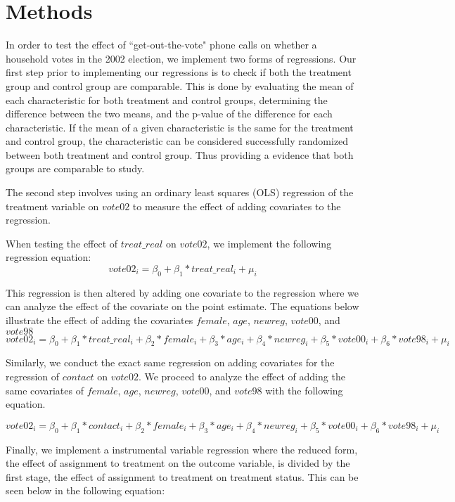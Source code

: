 \documentclass[12pt]{article}
\begin{document}
\section{Methods}
\indent In order to test the effect of ``get-out-the-vote" phone calls on whether a household votes in the 2002 election, we implement two forms of regressions. Our first step prior to implementing our regressions is to check if both the treatment group and control group are comparable. This is done by evaluating the mean of each characteristic for both treatment and control groups, determining the difference between the two means, and the p-value of the difference for each characteristic. If the mean of a given characteristic is the same for the treatment and control group, the characteristic can be considered successfully randomized between both treatment and control group. Thus providing a evidence that both groups are comparable to study.

\indent The second step involves using an ordinary least squares (OLS) regression of the treatment variable on $vote02$ to measure the effect of adding covariates to the regression.

\indent When testing the effect of $treat\_real$ on $vote02$, we implement the following regression equation:
$$vote02_i = \beta_0 +\beta_1*treat\_real_i+\mu_i$$

This regression is then altered by adding one covariate to the regression where we can analyze the effect of the covariate on the point estimate. The equations below illustrate the effect of adding the covariates $female$, $age$, $newreg$, $vote00$, and $vote98$
$$vote02_i = \beta_0 +\beta_1*treat\_real_i+\beta_2*female_i+\beta_3*age_i+\beta_4*newreg_i+\beta_5*vote00_i+\beta_6*vote98_i+\mu_i$$

\indent Similarly, we conduct the exact same regression on adding covariates for the regression of $contact$ on $vote02$. We proceed to analyze the effect of adding the same covariates of $female$, $age$, $newreg$, $vote00$, and $vote98$ with the following equation.
 
$$vote02_i = \beta_0 +\beta_1*contact_i+\beta_2*female_i+\beta_3*age_i+\beta_4*newreg_i+\beta_5*vote00_i+\beta_6*vote98_i+\mu_i$$

\indent Finally, we implement a instrumental variable regression where the reduced form, the effect of assignment to treatment on the outcome variable, is divided by the first stage, the effect of assignment to treatment on treatment status. This can be seen below in the following equation:
\end{document}
